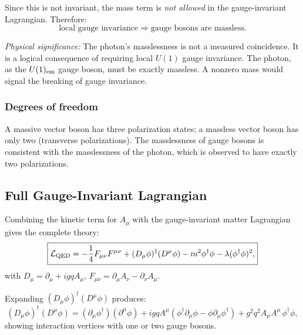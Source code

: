 \documentclass[../main.tex]{subfiles}
\begin{document}
Since this is not invariant, the mass term is \emph{not allowed} in the gauge-invariant Lagrangian.  Therefore:
\begin{equation}
  \boxed{
  \text{local gauge invariance}
  \;\Longrightarrow\;
  \text{gauge bosons are massless.}}
  \label{eq:lec10:masslessness}
\end{equation}

\textit{Physical significance:} The photon's masslessness is not a measured coincidence.  It is a logical consequence of requiring local $U(1)$ gauge invariance.  The photon, as the $U(1)_{\rm em}$ gauge boson, must be exactly massless.  A nonzero mass would signal the breaking of gauge invariance.

\subsubsection*{Degrees of freedom}

A massive vector boson has three polarization states; a massless vector boson has only two (transverse polarizations).  The masslessness of gauge bosons is consistent with the masslessness of the photon, which is observed to have exactly two polarizations.

\subsection*{Full Gauge-Invariant Lagrangian}

Combining the kinetic term for $A_\mu$ with the gauge-invariant matter Lagrangian gives the complete theory:
\begin{equation}
  \boxed{
  \mathcal{L}_{\mathrm{QED}}
  =
  -\frac{1}{4}F_{\mu\nu}F^{\mu\nu}
  +
  (D_\mu\phi)^\dagger(D^\mu\phi)
  -m^2\phi^\dagger\phi
  -\lambda(\phi^\dagger\phi)^2,}
  \label{eq:lec10:full-qed-scalar}
\end{equation}
with $D_\mu=\partial_\mu+igqA_\mu$, $F_{\mu\nu}=\partial_\mu A_\nu-\partial_\nu A_\mu$.

Expanding $(D_\mu\phi)^\dagger(D^\mu\phi)$ produces:
\begin{equation}
  (D_\mu\phi)^\dagger(D^\mu\phi)
  =
  (\partial_\mu\phi^\dagger)(\partial^\mu\phi)
  + igqA^\mu(\phi^\dagger\partial_\mu\phi - \phi\partial_\mu\phi^\dagger)
  + g^2q^2A_\mu A^\mu\,\phi^\dagger\phi,
  \label{eq:lec10:expanded-kinetic}
\end{equation}
showing interaction vertices with one or two gauge bosons.
\end{document}
